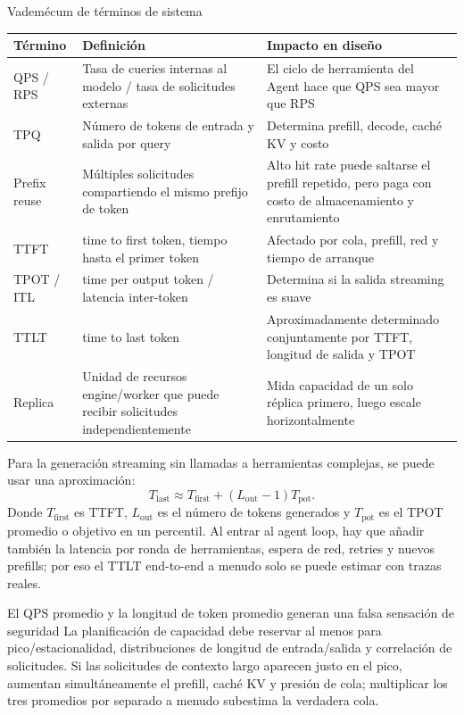 \begin{knowledgebox}{Vademécum de términos de sistema}
\begin{tabularx}{\textwidth}{L{2.5cm}YY}
Término & Definición & Impacto en diseño \\
\midrule
QPS / RPS & Tasa de cueries internas al modelo / tasa de solicitudes externas & El ciclo de herramienta del Agent hace que QPS sea mayor que RPS \\
TPQ & Número de tokens de entrada y salida por query & Determina prefill, decode, caché KV y costo \\
Prefix reuse & Múltiples solicitudes compartiendo el mismo prefijo de token & Alto hit rate puede saltarse el prefill repetido, pero paga con costo de almacenamiento y enrutamiento \\
TTFT & time to first token, tiempo hasta el primer token & Afectado por cola, prefill, red y tiempo de arranque \\
TPOT / ITL & time per output token / latencia inter-token & Determina si la salida streaming es suave \\
TTLT & time to last token & Aproximadamente determinado conjuntamente por TTFT, longitud de salida y TPOT \\
Replica & Unidad de recursos engine/worker que puede recibir solicitudes independientemente & Mida capacidad de un solo réplica primero, luego escale horizontalmente \\
\bottomrule
\end{tabularx}
\end{knowledgebox}

Para la generación streaming sin llamadas a herramientas complejas, se puede usar una aproximación:
\[
T_{\mathrm{last}}\approx T_{\mathrm{first}}+(L_{\mathrm{out}}-1)T_{\mathrm{pot}}.
\]
Donde $T_{\mathrm{first}}$ es TTFT, $L_{\mathrm{out}}$ es el número de tokens generados y $T_{\mathrm{pot}}$ es el TPOT promedio o objetivo en un percentil. Al entrar al agent loop, hay que añadir también la latencia por ronda de herramientas, espera de red, retries y nuevos prefills; por eso el TTLT end-to-end a menudo solo se puede estimar con trazas reales.

\begin{warningbox}{El QPS promedio y la longitud de token promedio generan una falsa sensación de seguridad}
La planificación de capacidad debe reservar al menos para pico/estacionalidad, distribuciones de longitud de entrada/salida y correlación de solicitudes. Si las solicitudes de contexto largo aparecen justo en el pico, aumentan simultáneamente el prefill, caché KV y presión de cola; multiplicar los tres promedios por separado a menudo subestima la verdadera cola.
\end{warningbox}

